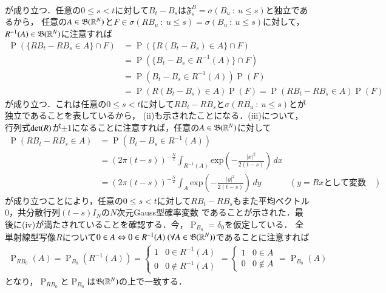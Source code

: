 \begin{prf}
\begin{description}
\begin{align}
		\end{align}
		が成り立つ．任意の$0 \leq s < t$に対して$B_t - B_s$は$\mathfrak{F}_s^B = \sigma(B_u\ :\ u \leq s)$と独立であるから，
		任意の$A \in \mathfrak{B}(\mathbb{R}^N)$と$F \in \sigma(RB_u\ :\ u \leq s) = \sigma(B_u\ :\ u \leq s)$に対して，
		$R^{-1}(A) \in \mathfrak{B}(\mathbb{R}^N)$に注意すれば
		\begin{align}
			\operatorname{P}\left(\{RB_t - RB_s \in A\} \cap F \right) 
			&= \operatorname{P}\left(\{R(B_t - B_s) \in A\} \cap F \right) \\
			&= \operatorname{P}\left(\{B_t - B_s \in R^{-1}(A)\} \cap F \right) \\
			&= \operatorname{P}\left(B_t - B_s \in R^{-1}(A)\right)\operatorname{P}(F) \\
			&= \operatorname{P}\left(R(B_t - B_s) \in A\right)\operatorname{P}(F)
			= \operatorname{P}\left(RB_t - RB_s \in A\right)\operatorname{P}(F)
		\end{align}
		が成り立つ．これは任意の$0 \leq s < t$に対して$RB_t - RB_s$と$\sigma(RB_u\ :\ u \leq s)$とが独立であることを表しているから，
		(ii)も示されたことになる．(iii)について，行列式$\operatorname{det} ( R )$が$\pm 1$になることに注意すれば，任意の$A \in \mathfrak{B}(\mathbb{R}^N)$に対して
		\begin{align}
			\operatorname{P}(RB_t - RB_s \in A) &= \operatorname{P}\left(B_t - B_s \in R^{-1}(A)\right) \\
			&= (2\pi(t-s))^{-\frac{N}{2}} \int_{R^{-1}(A)} \mathrm{exp}\left( -\frac{|x|^2}{2(t-s)} \right)\, dx \\
			&= (2\pi(t-s))^{-\frac{N}{2}} \int_{A} \mathrm{exp}\left( -\frac{|y|^2}{2(t-s)} \right)\, dy & \left(y = Rx\mbox{として変数変換}\right)
		\end{align}
		が成り立つことにより，任意の$0 \leq s < t$に対して$RB_t - RB_s$もまた平均ベクトル0，共分散行列$(t-s)I_N$の$N$次元Gauss型確率変数
		であることが示された．最後に(iv)が満たされていることを確認する．今，$\operatorname{P}_{B_0} = \delta_0$を仮定している．
		全単射線型写像$R$について$0 \in A \Leftrightarrow 0 \in R^{-1}(A)\ (\forall A \in \mathfrak{B}(\mathbb{R}^N))$であることに注意すれば
		\begin{align}
			\operatorname{P}_{RB_0}(A) = \operatorname{P}_{B_0}(R^{-1}(A)) 
			= \begin{cases}
				1 & 0 \in R^{-1}(A) \\
				0 & 0 \notin R^{-1}(A)
			\end{cases}
			= \begin{cases}
				1 & 0 \in A \\
				0 & 0 \notin A
			\end{cases}
			= \operatorname{P}_{B_0}(A)
		\end{align}
		となり，$\operatorname{P}_{RB_0}$と$\operatorname{P}_{B_0}$は$\mathfrak{B}(\mathbb{R}^N)$の上で一致する．
		\QED
	

\end{description}
\end{prf}
